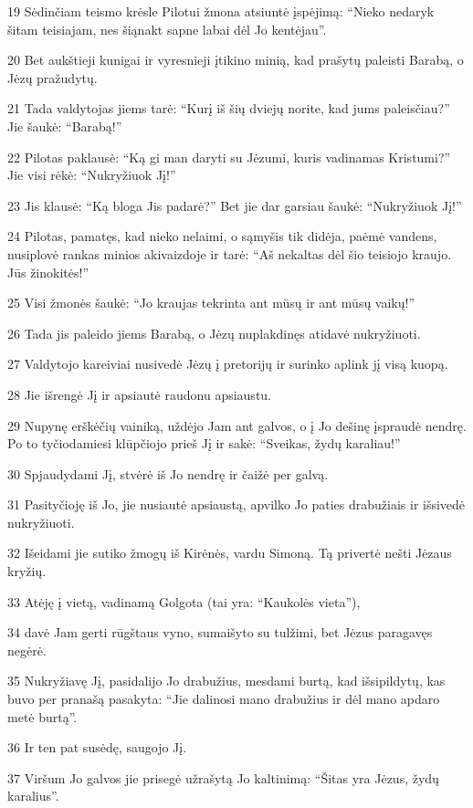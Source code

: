 \par 19 Sėdinčiam teismo krėsle Pilotui žmona atsiuntė įspėjimą: “Nieko nedaryk šitam teisiajam, nes šiąnakt sapne labai dėl Jo kentėjau”. 
\par 20 Bet aukštieji kunigai ir vyresnieji įtikino minią, kad prašytų paleisti Barabą, o Jėzų pražudytų. 
\par 21 Tada valdytojas jiems tarė: “Kurį iš šių dviejų norite, kad jums paleisčiau?” Jie šaukė: “Barabą!” 
\par 22 Pilotas paklausė: “Ką gi man daryti su Jėzumi, kuris vadinamas Kristumi?” Jie visi rėkė: “Nukryžiuok Jį!” 
\par 23 Jis klausė: “Ką bloga Jis padarė?” Bet jie dar garsiau šaukė: “Nukryžiuok Jį!” 
\par 24 Pilotas, pamatęs, kad nieko nelaimi, o sąmyšis tik didėja, paėmė vandens, nusiplovė rankas minios akivaizdoje ir tarė: “Aš nekaltas dėl šio teisiojo kraujo. Jūs žinokitės!” 
\par 25 Visi žmonės šaukė: “Jo kraujas tekrinta ant mūsų ir ant mūsų vaikų!” 
\par 26 Tada jis paleido jiems Barabą, o Jėzų nuplakdinęs atidavė nukryžiuoti. 
\par 27 Valdytojo kareiviai nusivedė Jėzų į pretorijų ir surinko aplink jį visą kuopą. 
\par 28 Jie išrengė Jį ir apsiautė raudonu apsiaustu. 
\par 29 Nupynę erškėčių vainiką, uždėjo Jam ant galvos, o į Jo dešinę įspraudė nendrę. Po to tyčiodamiesi klūpčiojo prieš Jį ir sakė: “Sveikas, žydų karaliau!” 
\par 30 Spjaudydami Jį, stvėrė iš Jo nendrę ir čaižė per galvą. 
\par 31 Pasityčioję iš Jo, jie nusiautė apsiaustą, apvilko Jo paties drabužiais ir išsivedė nukryžiuoti. 
\par 32 Išeidami jie sutiko žmogų iš Kirėnės, vardu Simoną. Tą privertė nešti Jėzaus kryžių. 
\par 33 Atėję į vietą, vadinamą Golgota (tai yra: “Kaukolės vieta”), 
\par 34 davė Jam gerti rūgštaus vyno, sumaišyto su tulžimi, bet Jėzus paragavęs negėrė. 
\par 35 Nukryžiavę Jį, pasidalijo Jo drabužius, mesdami burtą, kad išsipildytų, kas buvo per pranašą pasakyta: “Jie dalinosi mano drabužius ir dėl mano apdaro metė burtą”. 
\par 36 Ir ten pat susėdę, saugojo Jį. 
\par 37 Viršum Jo galvos jie prisegė užrašytą Jo kaltinimą: “Šitas yra Jėzus, žydų karalius”. 

